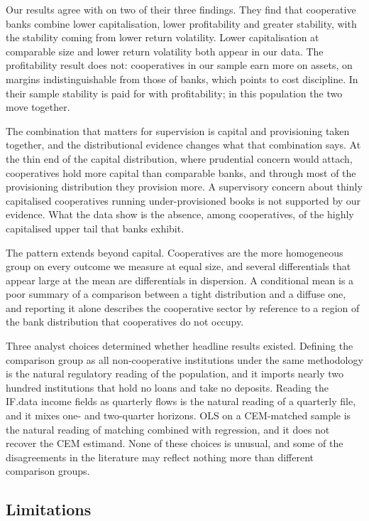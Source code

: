 \documentclass[11pt,a4paper]{article}
\begin{document}
Our results agree with \citet{hesse2007} on two of their three findings. They find that
cooperative banks combine lower capitalisation, lower profitability and greater
stability, with the stability coming from lower return volatility. Lower capitalisation
at comparable size and lower return volatility both appear in our data. The profitability
result does not: cooperatives in our sample earn more on assets, on margins
indistinguishable from those of banks, which points to cost discipline. In their sample
stability is paid for with profitability; in this population the two move together.

The combination that matters for supervision is capital and provisioning taken together,
and the distributional evidence changes what that combination says. At the thin end of
the capital distribution, where prudential concern would attach, cooperatives hold more
capital than comparable banks, and through most of the provisioning distribution they
provision more. A supervisory concern about thinly capitalised cooperatives running
under-provisioned books is not supported by our evidence. What the data show is the
absence, among cooperatives, of the highly capitalised upper tail that banks exhibit.

The pattern extends beyond capital. Cooperatives are the more homogeneous group on every
outcome we measure at equal size, and several differentials that appear large at the mean
are differentials in dispersion. A conditional mean is a poor summary of a comparison
between a tight distribution and a diffuse one, and reporting it alone describes the
cooperative sector by reference to a region of the bank distribution that cooperatives do
not occupy.

Three analyst choices determined whether headline results existed. Defining the
comparison group as all non-cooperative institutions under the same methodology is the
natural regulatory reading of the population, and it imports nearly two hundred
institutions that hold no loans and take no deposits. Reading the IF.data income fields
as quarterly flows is the natural reading of a quarterly file, and it mixes one- and
two-quarter horizons. OLS on a CEM-matched sample is the natural reading of matching
combined with regression, and it does not recover the CEM estimand. None of these
choices is unusual, and some of the disagreements in the literature may reflect nothing
more than different comparison groups.

\subsection{Limitations}
\end{document}
